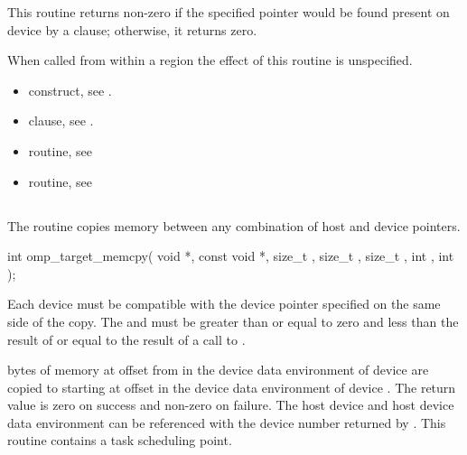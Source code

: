 \begin{ccppspecific}
\effect
This routine returns non-zero if the specified pointer
would be found present on device  by a 
clause; otherwise, it returns zero.

When called from within a  region
the effect of this routine is unspecified.

\crossreferences
\begin{itemize}
\item {} construct, see .

\item {} clause, see .

\item {} routine, see

\item {} routine, see
\end{itemize}



\subsection{}
\label{subsec:omp_target_memcpy}
\summary

The  routine copies memory between any combination
of host and device pointers.

\format
\begin{ompcFunction}
int omp_target_memcpy(
  void *,
  const void *,
  size_t ,
  size_t ,
  size_t ,
  int ,
  int 
);
\end{ompcFunction}

\constraints
Each device must be compatible with the device pointer specified 
on the same side of the copy. The  and 
 must be greater than or equal to zero and 
less than the result of  or equal to 
the result of a call to .

\effect
{} bytes of memory at offset  from  
in the device data environment of device  are
copied to  starting at offset  in the device data
environment of device . The return value is zero on 
success and non-zero on failure.  The host device and host device data 
environment can be referenced with the device number returned by 
. This routine contains a task scheduling point.


\end{ccppspecific}
